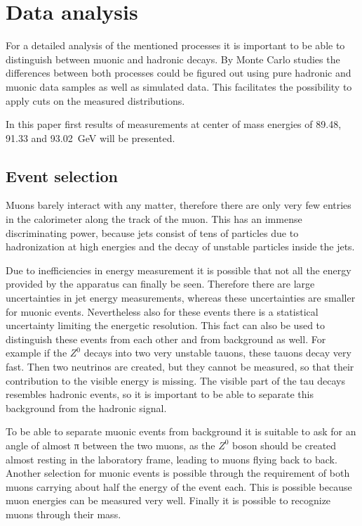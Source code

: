 \documentclass[epj,nopacs]{svjour}
\begin{document}
\section{ Data analysis}

For a detailed analysis of the mentioned processes it is important to be able
to distinguish between muonic and hadronic decays. By Monte Carlo studies the
differences between both processes could be figured out using pure hadronic and
muonic data samples as well as simulated data.
This facilitates the
possibility to apply cuts on the measured distributions.

In this paper first results of measurements at center of mass energies of
\num{89.48}, \num{91.33} and \SI{93.02}{\giga\electronvolt} will be presented.

\subsection{ Event selection}
Muons barely interact with any matter, therefore there are only very few
entries in the calorimeter along the track of the muon. This has an immense
discriminating power, because jets consist of tens of particles due to
hadronization at high energies and the decay of unstable particles inside the
jets.

Due to inefficiencies in energy measurement it is possible that not all the
energy provided by the apparatus can finally be seen. Therefore there are large
uncertainties in jet energy measurements, whereas these uncertainties are
smaller for muonic events. Nevertheless also for these events there is a
statistical uncertainty limiting the energetic resolution. This fact can also be
used to distinguish these
events from each other and from background as well. For example if the $Z^0$
decays into two very unstable tauons, these tauons decay very fast. Then two
neutrinos are created, but they cannot be measured, so that their contribution
to the visible energy is missing. The visible part of the tau decays resembles
hadronic events, so it is important to be able to separate this background from
the hadronic signal.

To be able to separate muonic events from background it is suitable to ask for
an angle of almost π between the two muons, as the $Z^0$ boson should be created
almost resting in
the laboratory frame, leading to muons flying back to back. Another selection
for muonic events is possible through the requirement of both muons carrying
about half the energy of the event each. This is possible because muon energies
can be measured very well. Finally it is possible to recognize muons through
their mass.
\end{document}
